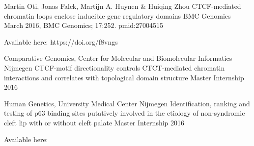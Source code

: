 

\begin{cventries}

\cventry
  {Martin Oti, Jonas Falck, Martijn A. Huynen \& Huiqing Zhou}
  {CTCF-mediated chromatin loops enclose inducible gene regulatory domains} %
  {BMC Genomics}
  {March 2016, BMC Genomics; 17:252. pmid:27004515} %
  {    
  \begin{cvitems} %
    \item {Available here: https://doi.org/f8vngs}
  \end{cvitems}
  }
\cventry
  {Comparative Genomics,  Center for Molecular and Biomolecular Informatics Nijmegen} %
  {CTCF-motif directionality controls CTCT-mediated chromatin interactions and correlates with topological domain structure} %
  {Master Internship} %
  {2016} %
  {
    \begin{cvitems} %
      \item {Available here: https://tinyurl.com/2p9hekax}
      }
    \end{cvitems}
  }
\cventry
  {Human Genetics, University Medical Center Nijmegen} %
  {Identification, ranking and testing of p63 binding sites putatively involved in the etiology of non-syndromic cleft lip with or without cleft palate} %
  {Master Internship} %
  {2016} %
  {
    \begin{cvitems} %
      \item {Available here: }
    \end{cvitems}
  }

\end{cventries}
